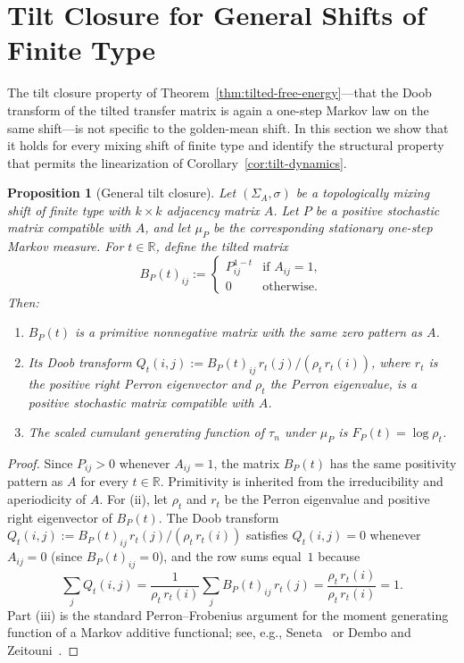 \documentclass[pdflatex,sn-basic,Numbered]{sn-jnl}
\theoremstyle{thmstyleone}
\newtheorem{proposition}[theorem]{Proposition}
\theoremstyle{thmstyletwo}
\theoremstyle{thmstylethree}
\newcommand{\RR}{\mathbb{R}}
\begin{document}
\section{Tilt Closure for General Shifts of Finite Type}\label{sec:general-tilt}

The tilt closure property of Theorem~\ref{thm:tilted-free-energy}---that the Doob transform of the tilted transfer matrix is again a one-step Markov law on the same shift---is not specific to the golden-mean shift. In this section we show that it holds for every mixing shift of finite type and identify the structural property that permits the linearization of Corollary~\ref{cor:tilt-dynamics}.

\begin{proposition}[General tilt closure]\label{prop:general-tilt}
Let $(\Sigma_A,\sigma)$ be a topologically mixing shift of finite type with $k\times k$ adjacency matrix $A$. Let $P$ be a positive stochastic matrix compatible with $A$, and let $\mu_P$ be the corresponding stationary one-step Markov measure. For $t\in\RR$, define the tilted matrix
\[
B_P(t)_{ij}:=
\begin{cases}
P_{ij}^{1-t} & \text{if } A_{ij}=1,\\
0 & \text{otherwise.}
\end{cases}
\]
Then:
\begin{enumerate}[label=(\roman*),leftmargin=*,itemsep=2pt]
  \item $B_P(t)$ is a primitive nonnegative matrix with the same zero pattern as $A$.
  \item Its Doob transform $Q_t(i,j):=B_P(t)_{ij}\,r_t(j)/(\rho_t\,r_t(i))$, where $r_t$ is the positive right Perron eigenvector and $\rho_t$ the Perron eigenvalue, is a positive stochastic matrix compatible with $A$.
  \item The scaled cumulant generating function of $\tau_n$ under $\mu_P$ is $F_P(t)=\log\rho_t$.
\end{enumerate}
\end{proposition}

\begin{proof}
Since $P_{ij}>0$ whenever $A_{ij}=1$, the matrix $B_P(t)$ has the same positivity pattern as $A$ for every $t\in\RR$. Primitivity is inherited from the irreducibility and aperiodicity of $A$. For (ii), let $\rho_t$ and $r_t$ be the Perron eigenvalue and positive right eigenvector of $B_P(t)$. The Doob transform $Q_t(i,j):=B_P(t)_{ij}\,r_t(j)/(\rho_t\,r_t(i))$ satisfies $Q_t(i,j)=0$ whenever $A_{ij}=0$ (since $B_P(t)_{ij}=0$), and the row sums equal~$1$ because
\[
\sum_j Q_t(i,j)=\frac{1}{\rho_t\,r_t(i)}\sum_j B_P(t)_{ij}\,r_t(j)=\frac{\rho_t\,r_t(i)}{\rho_t\,r_t(i)}=1.
\]
Part (iii) is the standard Perron--Frobenius argument for the moment generating function of a Markov additive functional; see, e.g., Seneta~\cite{Seneta2006} or Dembo and Zeitouni~\cite{DemboZeitouni2010}.
\end{proof}
\end{document}
